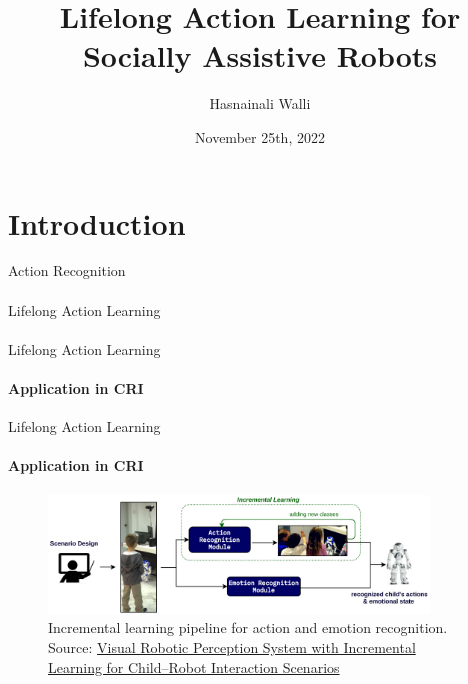 \documentclass[aspectratio=169]{beamer}
\author[H. Walli]{Hasnainali Walli}
\title{Lifelong Action Learning for Socially Assistive Robots}
\institute[HBRS]{Hochschule Bonn-Rhein-Sieg}
\date{November 25th, 2022}
\begin{document}
{
\begin{frame}
\titlepage
\end{frame}
}


\section{Introduction}

\begin{frame}{Action Recognition}
      \framesubtitle{}%
\end{frame}

\begin{frame}{Lifelong Action Learning}
      \framesubtitle{}%
\end{frame}

\begin{frame}{Lifelong Action Learning}
      \framesubtitle{Application in CRI}%
\end{frame}

\begin{frame}{Lifelong Action Learning}
      \framesubtitle{Application in CRI}%
      \begin{figure}[h!]
      \centering
      \includegraphics[width=0.9\textwidth]{images/IL_pipeline.png} 
      \caption{Incremental learning pipeline for action and emotion recognition. Source: \href{https://doi.org/10.3390/technologies9040086}{Visual Robotic Perception System with Incremental Learning for Child–Robot Interaction Scenarios}}
      \end{figure} 
\end{frame}
\end{document}
